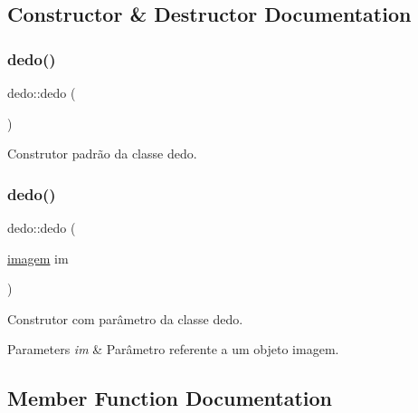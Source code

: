 \subsection{Constructor \& Destructor Documentation}
\mbox{\label{classdedo_a7099ad8c3d3a2a21685c25c2ccc95765}} 
\subsubsection{\texorpdfstring{dedo()}{dedo()}\hspace{0.1cm}{\footnotesize\ttfamily [1/2]}}
{\footnotesize\ttfamily dedo\+::dedo (\begin{DoxyParamCaption}{ }\end{DoxyParamCaption})\hspace{0.3cm}{\ttfamily [inline]}}



Construtor padrão da classe dedo. 

\mbox{\label{classdedo_a07bf77eb028fadc8a1e84f56c9982b2d}} 
\subsubsection{\texorpdfstring{dedo()}{dedo()}\hspace{0.1cm}{\footnotesize\ttfamily [2/2]}}
{\footnotesize\ttfamily dedo\+::dedo (\begin{DoxyParamCaption}\item[{\mbox{\hyperlink{classimagem}{imagem}}}]{im }\end{DoxyParamCaption})}



Construtor com parâmetro da classe dedo. 


\begin{DoxyParams}{Parameters}
{\em im} & Parâmetro referente a um objeto imagem. ~\newline
 \\
\hline
\end{DoxyParams}


\subsection{Member Function Documentation}
\mbox{\label{classdedo_a89112db7f0de9d4c3349b7766db45104}} 
